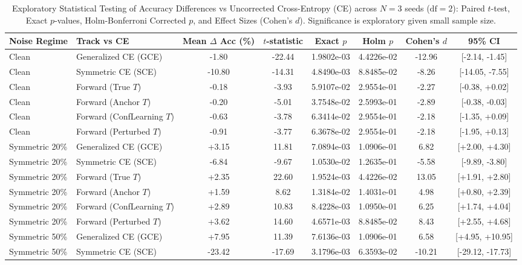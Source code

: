 \begin{table}[t]
\centering
\caption{Exploratory Statistical Testing of Accuracy Differences vs Uncorrected Cross-Entropy (CE) across $N=3$ seeds ($\text{df}=2$): Paired $t$-test, Exact $p$-values, Holm-Bonferroni Corrected $p$, and Effect Sizes (Cohen's $d$). Significance is exploratory given small sample size.}
\label{tab:significance}
\small
\begin{tabular}{llcccccc}
\hline
\textbf{Noise Regime} & \textbf{Track vs CE} & \textbf{Mean $\Delta$ Acc (\%)} & \textbf{$t$-statistic} & \textbf{Exact $p$} & \textbf{Holm $p$} & \textbf{Cohen's $d$} & \textbf{95\% CI} \\
\hline
Clean & Generalized CE (GCE) & -1.80 & -22.44 & 1.9802e-03 & 4.4226e-02 & -12.96 & [-2.14, -1.45] \\
Clean & Symmetric CE (SCE) & -10.80 & -14.31 & 4.8490e-03 & 8.8485e-02 & -8.26 & [-14.05, -7.55] \\
Clean & Forward (True $T$) & -0.18 & -3.93 & 5.9107e-02 & 2.9554e-01 & -2.27 & [-0.38, +0.02] \\
Clean & Forward (Anchor $T$) & -0.20 & -5.01 & 3.7548e-02 & 2.5993e-01 & -2.89 & [-0.38, -0.03] \\
Clean & Forward (ConfLearning $T$) & -0.63 & -3.78 & 6.3414e-02 & 2.9554e-01 & -2.18 & [-1.35, +0.09] \\
Clean & Forward (Perturbed $T$) & -0.91 & -3.77 & 6.3678e-02 & 2.9554e-01 & -2.18 & [-1.95, +0.13] \\
Symmetric 20\% & Generalized CE (GCE) & +3.15 & 11.81 & 7.0894e-03 & 1.0906e-01 & 6.82 & [+2.00, +4.30] \\
Symmetric 20\% & Symmetric CE (SCE) & -6.84 & -9.67 & 1.0530e-02 & 1.2635e-01 & -5.58 & [-9.89, -3.80] \\
Symmetric 20\% & Forward (True $T$) & +2.35 & 22.60 & 1.9524e-03 & 4.4226e-02 & 13.05 & [+1.91, +2.80] \\
Symmetric 20\% & Forward (Anchor $T$) & +1.59 & 8.62 & 1.3184e-02 & 1.4031e-01 & 4.98 & [+0.80, +2.39] \\
Symmetric 20\% & Forward (ConfLearning $T$) & +2.89 & 10.83 & 8.4228e-03 & 1.0950e-01 & 6.25 & [+1.74, +4.04] \\
Symmetric 20\% & Forward (Perturbed $T$) & +3.62 & 14.60 & 4.6571e-03 & 8.8485e-02 & 8.43 & [+2.55, +4.68] \\
Symmetric 50\% & Generalized CE (GCE) & +7.95 & 11.39 & 7.6136e-03 & 1.0906e-01 & 6.58 & [+4.95, +10.95] \\
Symmetric 50\% & Symmetric CE (SCE) & -23.42 & -17.69 & 3.1796e-03 & 6.3593e-02 & -10.21 & [-29.12, -17.73] \\

\end{tabular}
\end{table}
